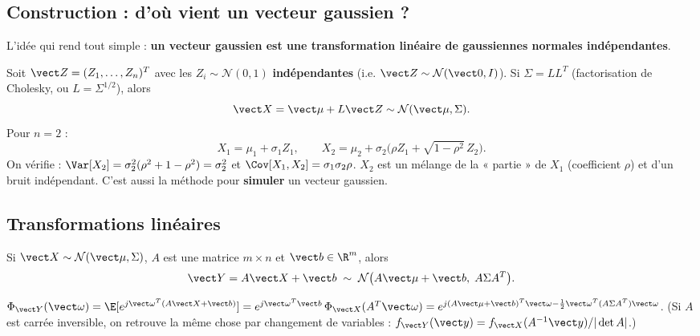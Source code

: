 \documentclass[11pt,a4paper,openany]{book}
\begin{document}
\subsection{Construction : d'où vient un vecteur gaussien ?}

L'idée qui rend tout simple : \textbf{un vecteur gaussien est une transformation linéaire de
gaussiennes normales indépendantes}.

\begin{keybox}[title={Fabriquer un vecteur gaussien}]
Soit $\vect Z = (Z_1,\dots,Z_n)^T$ avec les $Z_i\sim\mathcal{N}(0,1)$ \textbf{indépendantes}
(i.e. $\vect Z \sim \mathcal{N}(\vect 0, I)$). Si $\Sigma = LL^T$ (factorisation de Cholesky, ou $L
= \Sigma^{1/2}$), alors
\[
\vect X = \vect\mu + L\vect Z \sim \mathcal{N}(\vect\mu,\Sigma).
\]
Pour $n = 2$ :
\[
X_1 = \mu_1 + \sigma_1 Z_1,\qquad
X_2 = \mu_2 + \sigma_2\big(\rho Z_1 + \sqrt{1-\rho^2}\,Z_2\big).
\]
On vérifie : $\Var[X_2] = \sigma_2^2(\rho^2+1-\rho^2) = \sigma_2^2$ et $\Cov[X_1,X_2] =
\sigma_1\sigma_2\rho$. $X_2$ est un mélange de la « partie » de $X_1$ (coefficient $\rho$) et
d'un bruit indépendant. C'est aussi la méthode pour \textbf{simuler} un vecteur gaussien.
\end{keybox}

\subsection{Transformations linéaires}

\begin{thmbox}[title={Une transformation linéaire garde la gaussianité}]
Si $\vect X \sim \mathcal{N}(\vect\mu,\Sigma)$, $A$ est une matrice $m\times n$ et $\vect b
\in\R^m$, alors
\[
\vect Y = A\vect X + \vect b \;\sim\; \mathcal{N}\big(A\vect\mu + \vect b,\; A\Sigma A^T\big).
\]
\end{thmbox}

\begin{proofbox}[title=Preuve]
$\Phi_{\vect Y}(\vect\omega) = \E[e^{j\vect\omega^T(A\vect X+\vect b)}] =
e^{j\vect\omega^T\vect b}\,\Phi_{\vect X}(A^T\vect\omega) = e^{j(A\vect\mu+\vect b)^T\vect\omega
- \frac12\vect\omega^T(A\Sigma A^T)\vect\omega}$. (Si $A$ est carrée inversible, on retrouve
la même chose par changement de variables : $f_{\vect Y}(\vect y) = f_{\vect X}(A^{-1}\vect
y)/|\det A|$.)
\end{proofbox}
\end{document}

